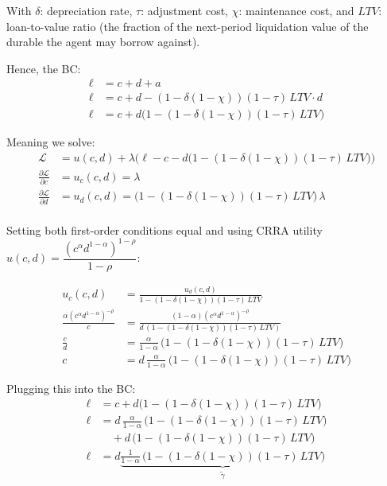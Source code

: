 \documentclass[\econtexMain]{subfiles}
\begin{document}
With $\delta$: depreciation rate, $\tau$: adjustment cost, $\chi$: maintenance cost, and $LTV$: loan-to-value ratio (the fraction of the next-period liquidation value of the durable the agent may borrow against).
	
Hence, the BC:
\begin{align}
	\ell &= c + d + a \\
	\ell &= c + d - (1-\delta(1-\chi))(1-\tau)\,LTV\cdot d \\
	\ell &= c + d\bigl(1 - (1-\delta(1-\chi))(1-\tau)\,LTV\bigr)
\end{align}
	
Meaning we solve:
\begin{align}
	\mathscr{L} &= u(c,d) + \lambda\bigl(\ell - c - d\bigl(1 - (1-\delta(1-\chi))(1-\tau)\,LTV\bigr)\bigr)\\
	\frac{\partial \mathscr{L}}{\partial c} &= u_c(c,d) = \lambda\\
	\frac{\partial \mathscr{L}}{\partial d} &= u_d(c,d) = \bigl(1-(1-\delta(1-\chi))(1-\tau)\,LTV\bigr)\,\lambda\\
\end{align}
	
Setting both first-order conditions equal and using CRRA utility $u(c,d) = \dfrac{(c^{\alpha} d^{1-\alpha})^{1-\rho}}{1-\rho}$:
	
\begin{align}
	u_c(c,d) &= \frac{u_d(c,d)}{1-(1-\delta(1-\chi))(1-\tau)\,LTV} \\
	\frac{\alpha (c^\alpha d^{1-\alpha})^{-\rho}}{c} &= \frac{(1-\alpha)(c^\alpha d^{1-\alpha})^{-\rho}}{d\,(1-(1-\delta(1-\chi))(1-\tau)\,LTV)} \\
	\frac{c}{d} &= \frac{\alpha}{1-\alpha}\,\bigl(1-(1-\delta(1-\chi))(1-\tau)\,LTV\bigr)\\
	c &= d\,\frac{\alpha}{1-\alpha}\,\bigl(1-(1-\delta(1-\chi))(1-\tau)\,LTV\bigr)
\end{align}
	
Plugging this into the BC:
\begin{align}
	\ell &= c + d\bigl(1-(1-\delta(1-\chi))(1-\tau)\,LTV\bigr) \\ 
	\ell &= d\,\frac{\alpha}{1-\alpha}\,\bigl(1-(1-\delta(1-\chi))(1-\tau)\,LTV\bigr) \\
	&\quad+ d\,\bigl(1-(1-\delta(1-\chi))(1-\tau)\,LTV\bigr) \\ 
	\ell &= d \underbrace{\frac{1}{1-\alpha}\,\bigl(1-(1-\delta(1-\chi))(1-\tau)\,LTV\bigr)}_{\tilde{\gamma}}
\end{align}
\end{document}
